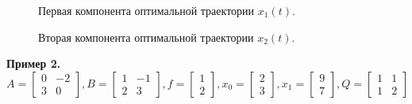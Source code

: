 \documentclass[10pt]{article}
\begin{document}
\begin{figure}[h]
	\caption*{Первая компонента оптимальной траектории \( x_1(t) \).}
\end{figure}
\begin{figure}[h!]
	\caption*{Вторая компонента оптимальной траектории \( x_2(t) \).}
\end{figure}
\newpage
\noindent \textbf{Пример 2.}\smallskip\\
 \[ A = \begin{bmatrix}
      		0 & -2 \\[0.3em]
      		3 & 0
      	  \end{bmatrix} , 
 B = \begin{bmatrix}
      	   1 & -1 \\[0.3em]
      	   2 & 3
      \end{bmatrix} ,
 f = \begin{bmatrix}
       	    1 \\[0.3em]
      	    2
      \end{bmatrix} ,
 x_0 = \begin{bmatrix}
      	    2 \\[0.3em]
      	    3
      \end{bmatrix} ,
 x_1 = \begin{bmatrix}
      	9 \\[0.3em]
      	7
      \end{bmatrix} ,
 Q = \begin{bmatrix}
      	   1 & 1 \\[0.3em]
      	   1 & 2
      \end{bmatrix} \]
\end{document}
